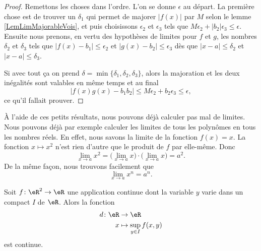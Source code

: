 \begin{proof}
    Remettons les choses dans l'ordre. L'on se donne $\epsilon$ au départ. La première chose est de trouver un $\delta_1$ qui permet de majorer $|f(x)|$ par $M$ selon le lemme \ref{LemLimMajorableVois}, et puis choisissons $\epsilon_2$ et $\epsilon_3$ tels que $M\epsilon_2+| b_2 |\epsilon_3\leq\epsilon$. Ensuite nous prenons, en vertu des hypothèses de limites pour $f$ et $g$, les nombres $\delta_2$ et $\delta_3$ tels que $| f(x)-b_1 |\leq \epsilon_2$ et $| g(x)-b_2 |\leq \epsilon_3$ dès que $| x-a |\leq \delta_2$ et $| x-a |\leq \delta_3$.

    Si avec tout ça on prend $\delta=\min\{ \delta_1,\delta_2,\delta_3 \}$, alors la majoration et les deux inégalités sont valables en même temps et au final
    \[ 
      | f(x)g(x)-b_1b_2 |\leq M\epsilon_2+b_2\epsilon_3\leq \epsilon,
    \]
    ce qu'il fallait prouver.

\end{proof}

À l'aide de ces petits résultats, nous pouvons déjà calculer pas mal de limites. Nous pouvons déjà par exemple calculer les limites de tous les polynômes en tous les nombres réels. En effet, nous savons la limite de la fonction $f(x)=x$. La fonction $x\mapsto x^2$ n'est rien d'autre que le produit de $f$ par elle-même. Donc
\[ 
  \lim_{x\to a}x^2=\big( \lim_{x\to a}x\big)\cdot\big( \lim_{x\to a}x \big)=a^2.
\]
De la même façon, nous trouvons facilement que 
\begin{equation}
 \lim_{x\to a}x^n=a^n.
\end{equation}

\begin{proposition}      \label{PROPooWXBAooAEweSF}
    Soit \( f\colon \eR^2\to \eR\) une application continue dont la variable \( y\) varie dans un compact \( I\) de \( \eR\). Alors la fonction
    \begin{equation}
        \begin{aligned}
            d\colon \eR&\to \eR \\
            x&\mapsto \sup_{y\in I} f(x,y) 
        \end{aligned}
    \end{equation}
    est continue.
\end{proposition}

